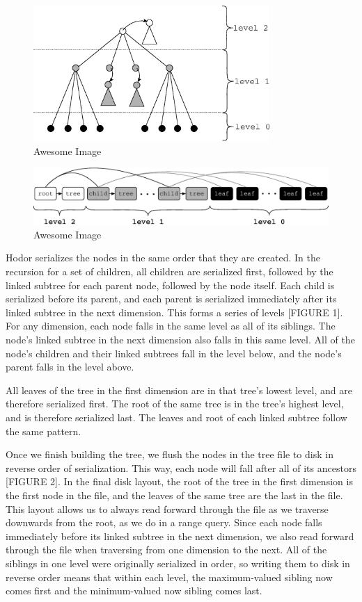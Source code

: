 \documentclass[11pt, oneside]{article}
\begin{document}
\begin{figure}[p]
    \centering
    \includegraphics[width=0.8\textwidth]{fig1.eps}
    \caption{Awesome Image}
\end{figure}
\begin{figure}[p]
    \centering
    \includegraphics[width=1\textwidth]{fig2.eps}
    \caption{Awesome Image}
\end{figure}

Hodor serializes the nodes in the same order that they are created. In the
recursion for a set of children, all children are serialized first, followed by
the linked subtree for each parent node, followed by the node itself. Each
child is serialized before its parent, and each parent is serialized
immediately after its linked subtree in the next dimension. This forms a series
of levels [FIGURE 1]. For any dimension, each node falls in the same level as
all of its siblings. The node's linked subtree in the next dimension also falls
in this same level. All of the node's children and their linked subtrees fall
in the level below, and the node's parent falls in the level above. 

All leaves of the tree in the first dimension are in that tree's lowest level,
and are therefore serialized first. The root of the same tree is in the tree's
highest level, and is therefore serialized last. The leaves and root of each
linked subtree follow the same pattern. 

Once we finish building the tree, we flush the nodes in the tree file to disk
in reverse order of serialization. This way, each node will fall after all of
its ancestors [FIGURE 2]. In the final disk layout, the root of the tree in the
first dimension is the first node in the file, and the leaves of the same tree
are the last in the file. This layout allows us to always read forward through
the file as we traverse downwards from the root, as we do in a range query.
Since each node falls immediately before its linked subtree in the next
dimension, we also read forward through the file when traversing from one
dimension to the next. All of the siblings in one level were originally
serialized in order, so writing them to disk in reverse order means that within
each level, the maximum-valued sibling now comes first and the minimum-valued
now sibling comes last. 
\end{document}
